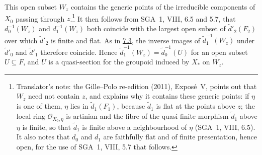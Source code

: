This open subset \(W_z\) contains the generic points of the irreducible
components of \(X_0\) passing through \(z\).\footnote{Translator's note: the Gille--Polo re-edition (2011), Exposé~V, points
out that \(W_z\) need not contain \(z\), and explains why it contains these
generic points: if \(\eta\) is one of them, \(\eta\) lies in
\(\widetilde d_1(F_1)\), because \(\widetilde d_1\) is flat at the points above \(z\); the
local ring \(\mathcal O_{X_0,\eta}\) is artinian and the fibre of the
quasi-finite morphism \(\widetilde d_1\) above \(\eta\) is finite, so that
\(\widetilde d_1\) is finite above a neighbourhood of \(\eta\) (SGA~1, VIII, 6.5). It
also notes that \(d_0\) and \(d_1\) are faithfully flat and of finite
presentation, hence open, for the use of SGA~1, VIII, 5.7 that follows.} It then follows from SGA~1,
VIII, 6.5 and 5.7, that
\(d_0^{-1}(W_z)\) and \(d_1^{-1}(W_z)\) both coincide with the largest
open subset of \(\widetilde d'_2(F_2)\) over which
\(\widetilde d'_2\) is finite and flat. As in
\hyperref[lem:sga3-V-7.3]{7.3}, the inverse images of
\(\widetilde d_1^{-1}(W_z)\) under \(\widetilde d'_0\) and
\(\widetilde d'_1\) therefore coincide. Hence
\(\widetilde d_1^{-1}(W_z)=\widetilde d_0^{-1}(U)\) for an open subset
\(U\subseteq F\), and \(U\) is a quasi-section for the groupoid induced
by \(X_\ast\) on \(W_z\).

